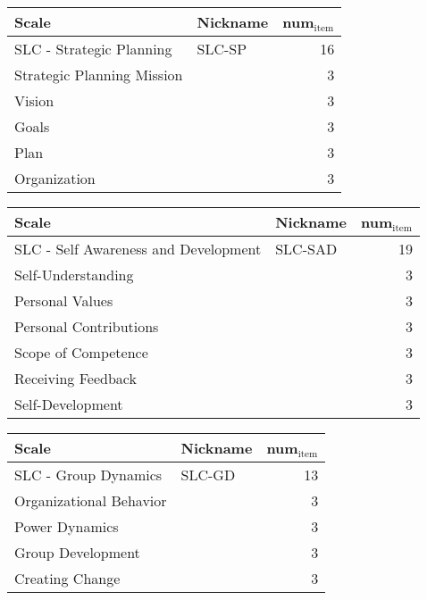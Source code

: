 \documentclass[11pt]{article}
\begin{document}
\begin{center}
\begin{tabular}{llr}
Scale & Nickname & num\(_{\text{item}}\)\\
\hline
SLC - Strategic Planning & SLC-SP & 16\\
\hline
Strategic Planning Mission &  & 3\\
Vision &  & 3\\
Goals &  & 3\\
Plan &  & 3\\
Organization &  & 3\\
\end{tabular}
\end{center}



\begin{center}
\begin{tabular}{llr}
Scale & Nickname & num\(_{\text{item}}\)\\
\hline
SLC - Self Awareness and Development & SLC-SAD & 19\\
\hline
Self-Understanding &  & 3\\
Personal Values &  & 3\\
Personal Contributions &  & 3\\
Scope of Competence &  & 3\\
Receiving Feedback &  & 3\\
Self-Development &  & 3\\
\end{tabular}
\end{center}


\begin{center}
\begin{tabular}{llr}
Scale & Nickname & num\(_{\text{item}}\)\\
\hline
SLC - Group Dynamics & SLC-GD & 13\\
\hline
Organizational Behavior &  & 3\\
Power Dynamics &  & 3\\
Group Development &  & 3\\
Creating Change &  & 3\\
\end{tabular}
\end{center}
\end{document}
